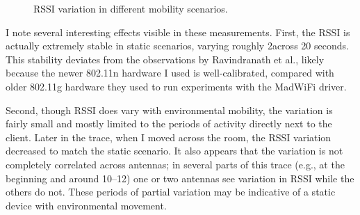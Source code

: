 \begin{figure}[htb]
	\hspace{0.06\textwidth}%
	\caption{\label{fig:mobility_rssi}RSSI variation in different mobility scenarios.}
\end{figure}

I note several interesting effects visible in these measurements. First, the RSSI is actually extremely stable in static scenarios, varying roughly 2\dB across 20 seconds. This stability deviates from the observations by Ravindranath et al., likely because the newer 802.11n hardware I used is well-calibrated, compared with older 802.11g hardware they used to run experiments with the MadWiFi driver.

Second, though RSSI does vary with environmental mobility, the variation is fairly small and mostly limited to the periods of activity directly next to the client. Later in the trace, when I moved across the room, the RSSI variation decreased to match the static scenario. It also appears that the variation is not completely correlated across antennas; in several parts of this trace (e.g., at the beginning and around 10\s--12\s) one or two antennas see variation in RSSI while the others do not. These periods of partial variation may be indicative of a static device with environmental movement.

